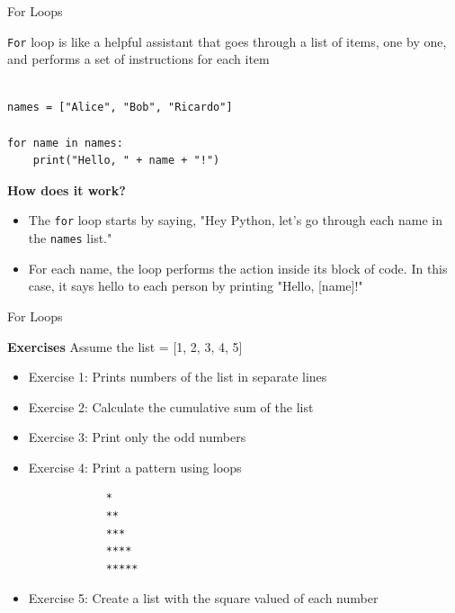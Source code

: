 \documentclass[
	11pt, 
]{beamer}
\begin{document}

\begin{frame}[fragile]{For Loops}

\texttt{For} loop is like a helpful assistant that goes through a list of items, one by one, and performs a set of instructions for each item

\begin{verbatim}

names = ["Alice", "Bob", "Ricardo"]

for name in names:
    print("Hello, " + name + "!")

\end{verbatim}

\begin{exampleblock}{\textbf{How does it work?}}
    \begin{itemize}
        \item The \texttt{for} loop starts by saying, "Hey Python, let's go through each name in the \texttt{names} list."
        \item For each name, the loop performs the action inside its block of code. In this case, it says hello to each person by printing "Hello, [name]!"
    \end{itemize}
\end{exampleblock}

\end{frame}


\begin{frame}[fragile]{For Loops}

\begin{alertblock}{\textbf{Exercises}}
Assume the list = [1, 2, 3, 4, 5]
\begin{itemize}
    \item Exercise 1: Prints numbers of the list in separate lines
    \item Exercise 2: Calculate the cumulative sum of the list
    \item Exercise 3: Print only the odd numbers
    \item Exercise 4: Print a pattern using loops
        \begin{verbatim}
            *
            **
            ***
            ****
            *****
        \end{verbatim}
    \item Exercise 5: Create a list with the square valued of each number
\end{itemize}    
\end{alertblock}

\end{frame}
\end{document}
